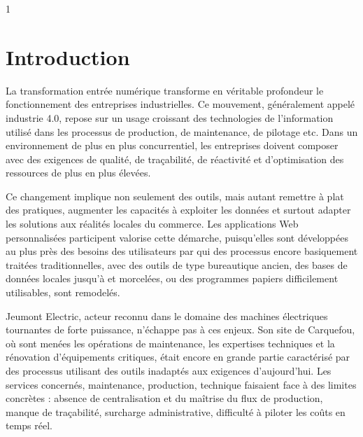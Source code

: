 \documentclass[11pt,a4paper]{article}
\begin{document}
\newpage
\begin{spacing}{1} %
	\renewcommand{\contentsname}{Table des matières}
	{\normalsize
	\tableofcontents}
\end{spacing}

\newpage

\renewcommand{\listfigurename}{Tables des images}
\listoffigures

\newpage
\listoftables

\newpage
\section*{Introduction}

La transformation entrée numérique transforme en véritable profondeur le fonctionnement des entreprises industrielles. Ce mouvement, généralement appelé industrie 4.0, repose sur un usage croissant des technologies de l’information utilisé dans les processus de production, de maintenance, de pilotage etc. Dans un environnement de plus en plus concurrentiel, les entreprises doivent composer avec des exigences de qualité, de traçabilité, de réactivité et d’optimisation des ressources de plus en plus élevées. 

Ce changement implique non seulement des outils, mais autant remettre à plat des pratiques, augmenter les capacités à exploiter les données et surtout adapter les solutions aux réalités locales du commerce. Les applications Web personnalisées participent valorise cette démarche, puisqu’elles sont développées au plus près des besoins des utilisateurs par qui des processus encore basiquement traitées traditionnelles, avec des outils de type bureautique ancien, des bases de données locales jusqu’à et morcelées, ou des programmes papiers difficilement utilisables, sont remodelés.

Jeumont Electric, acteur reconnu dans le domaine des machines électriques tournantes de forte puissance, n’échappe pas à ces enjeux.  Son site de Carquefou, où sont menées les opérations de maintenance, les expertises techniques et la rénovation d’équipements critiques, était encore en grande partie caractérisé par des processus utilisant des outils inadaptés aux exigences d'aujourd’hui. Les services concernés, maintenance, production, technique faisaient face à des limites concrètes : absence de centralisation et du maîtrise du flux de production, manque de traçabilité, surcharge administrative, difficulté à piloter les coûts en temps réel.
\end{document}
